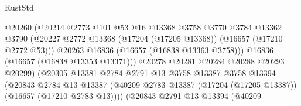 \begin{lexlean}{RustStd}
\begin{coremodule}
                                          @20260
                                          (@20214
                                            @2773
                                            @101
                                            @53
                                            @16
                                            @13368
                                            @3758
                                            @3770
                                            @3784
                                            @13362
                                            @3790
                                            (@20227
                                              @2772
                                              @13368
                                              (@17204 (@17205 @13368))
                                              (@16657 (@17210 @2772 @53)))
                                            @20263
                                            @16836
                                            (@16657 (@16838 @13363 @3758)))
                                          @16836
                                          (@16657 (@16838 @13353 @13371)))
                                        @20278
                                        @20281
                                        @20284
                                        @20288
                                        @20293
                                        @20299)
                                      (@20305
                                        @13381
                                        @2784
                                        @2791
                                        @13
                                        @3758
                                        @13387
                                        @3758
                                        @13394
                                        (@20843
                                          @2784
                                          @13
                                          @13387
                                          (@40209
                                            @2783
                                            @13387
                                            (@17204 (@17205 @13387))
                                            (@16657 (@17210 @2783 @13))))
                                        (@20843
                                          @2791
                                          @13
                                          @13394
                                          (@40209

\end{coremodule}
\end{lexlean}

